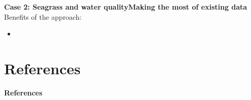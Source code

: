 \documentclass[serif]{beamer}\usepackage[]{graphicx}\usepackage[]{color}
\begin{document}
\begin{frame}{\textbf{Case 2: Seagrass and water quality}}{\textbf{Making the most of existing data}}
Benefits of the approach:
\begin{itemize}
\item
\end{itemize}
\end{frame}

\section{References}
\begin{frame}[allowframebreaks]{\textbf{References}}
\tiny
{}


\end{frame}
\end{document}
